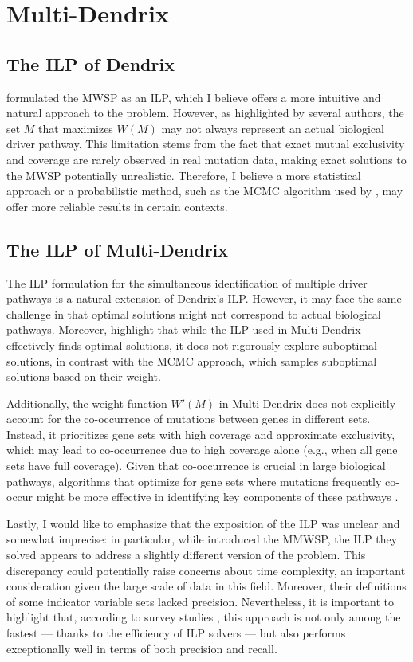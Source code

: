 \section{Multi-Dendrix}

\subsection{The ILP of Dendrix}

\textcite{multi-dendrix} formulated the MWSP as an ILP, which I believe offers a more intuitive and natural approach to the problem. However, as highlighted by several authors, the set $M$ that maximizes $W(M)$ may not always represent an actual biological driver pathway. This limitation stems from the fact that exact mutual exclusivity and coverage are rarely observed in real mutation data, making exact solutions to the MWSP potentially unrealistic. Therefore, I believe a more statistical approach or a probabilistic method, such as the MCMC algorithm used by \textcite{dendrix}, may offer more reliable results in certain contexts.

\subsection{The ILP of Multi-Dendrix}

The ILP formulation for the simultaneous identification of multiple driver pathways is a natural extension of Dendrix's ILP. However, it may face the same challenge in that optimal solutions might not correspond to actual biological pathways. Moreover, \textcite{multi-dendrix} highlight that while the ILP used in Multi-Dendrix effectively finds optimal solutions, it does not rigorously explore suboptimal solutions, in contrast with the MCMC approach, which samples suboptimal solutions based on their weight.

Additionally, the weight function $W'(M)$ in Multi-Dendrix does not explicitly account for the co-occurrence of mutations between genes in different sets. Instead, it prioritizes gene sets with high coverage and approximate exclusivity, which may lead to co-occurrence due to high coverage alone (e.g., when all gene sets have full coverage). Given that co-occurrence is crucial in large biological pathways, algorithms that optimize for gene sets where mutations frequently co-occur might be more effective in identifying key components of these pathways \cite{multi-dendrix}.

Lastly, I would like to emphasize that the exposition of the ILP was unclear and somewhat imprecise: in particular, while \textcite{multi-dendrix} introduced the MMWSP, the ILP they solved appears to address a slightly different version of the problem. This discrepancy could potentially raise concerns about time complexity, an important consideration given the large scale of data in this field. Moreover, their definitions of some indicator variable sets lacked precision. Nevertheless, it is important to highlight that, according to survey studies \cite{survey}, this approach is not only among the fastest --- thanks to the efficiency of ILP solvers --- but also performs exceptionally well in terms of both precision and recall.

\cleardoublepage

